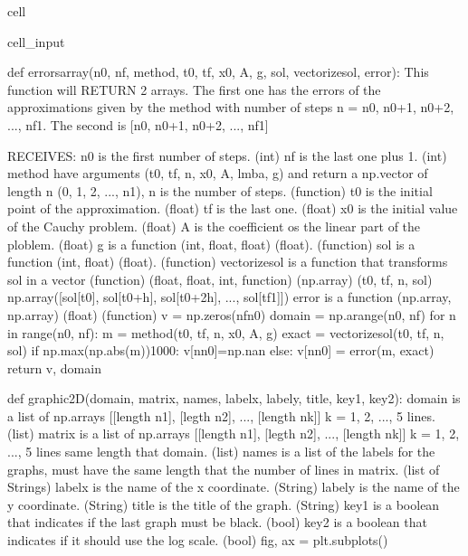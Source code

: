 \documentclass[letterpaper,10pt,english]{jupyterBook}
\begin{document}
\begin{sphinxuseclass}{cell}
\begin{sphinxVerbatimInput}
\begin{sphinxuseclass}{cell_input}
\begin{sphinxVerbatim}[commandchars=\\\{\}]
def errors\PYGZus{}array(n0, nf, method, t0, tf, x0, A, g, sol, vectorize\PYGZus{}sol, error):
  \PYGZsq{}\PYGZsq{}\PYGZsq{}
  This function will RETURN 2 arrays.
  The first one has the errors of the approximations given by the method with
  number of steps n = n0, n0+1, n0+2, ..., nf\PYGZhy{}1.
  The second is [n0, n0+1, n0+2, ..., nf\PYGZhy{}1]

  RECEIVES:
  n0 is the first number of steps. (int)
  nf is the last one plus 1. (int)
  method have arguments (t0, tf, n, x0, A, lmba, g) and return a
  np.vector of length n (0, 1, 2, ..., n\PYGZhy{}1), n is the number of steps. (function)
  t0 is the initial point of the approximation. (float)
  tf is the last one. (float)
  x0 is the initial value of the Cauchy problem. (float)
  A is the coefficient os the linear part of the ploblem. (float)
  g is a function (int, float, float) \PYGZhy{}\PYGZgt{} (float). (function)
  sol is a function (int, float) \PYGZhy{}\PYGZgt{} (float). (function)
  vectorize\PYGZus{}sol is a function that \PYGZdq{}transforms sol in a vector\PYGZdq{} (function)
  (float, float, int, function) \PYGZhy{}\PYGZgt{} (np.array)
  (t0, tf, n, sol) \PYGZhy{}\PYGZgt{} np.array([sol[t0], sol[t0+h], sol[t0+2h], ..., sol[tf\PYGZhy{}1]])
  error is a function (np.array, np.array) \PYGZhy{}\PYGZgt{} (float) (function)
  \PYGZsq{}\PYGZsq{}\PYGZsq{}
  v = np.zeros(nf\PYGZhy{}n0)
  domain = np.arange(n0, nf)
  for n in range(n0, nf):
    m = method(t0, tf, n, x0, A, g)
    exact = vectorize\PYGZus{}sol(t0, tf, n, sol)
    if np.max(np.abs(m))\PYGZgt{}1000:
        v[n\PYGZhy{}n0]=np.nan
    else:
        v[n\PYGZhy{}n0] = error(m, exact)
  return v, domain

def graphic\PYGZus{}2D(domain, matrix, names, labelx, labely, title, key1, key2):
  \PYGZsq{}\PYGZsq{}\PYGZsq{}
  domain is a list of np.arrays [[length n1], [legth n2], ..., [length nk]]
  k = 1, 2, ..., 5 lines. (list)
  matrix is a list of np.arrays [[length n1], [legth n2], ..., [length nk]]
  k = 1, 2, ..., 5 lines \PYGZhy{} same length that domain. (list)
  names is a list of the labels for the graphs, must have the same length that
  the number of lines in matrix. (list of Strings)
  labelx is the name of the x coordinate. (String)
  labely is the name of the y coordinate. (String)
  title is the title of the graph. (String)
  key1 is a boolean that indicates if the last graph must be black. (bool)
  key2 is a boolean that indicates if it should use the log scale. (bool)
  \PYGZsq{}\PYGZsq{}\PYGZsq{}
  fig, ax = plt.subplots()


\end{sphinxVerbatim}
\end{sphinxuseclass}
\end{sphinxVerbatimInput}
\end{sphinxuseclass}
\end{document}
